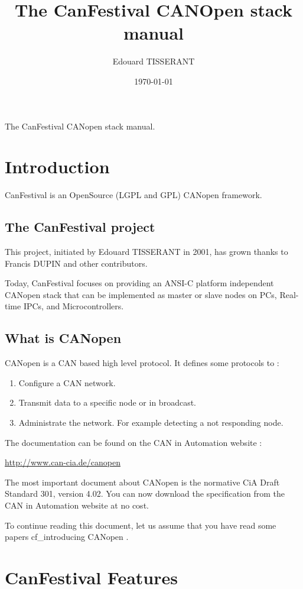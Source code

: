 \documentclass[12pt,english,a4paper]{book}
\title{\Huge The CanFestival CANOpen stack manual}
\author{Edouard TISSERANT}
\date{\today}
\newcommand{\canopen}{CANopen }
\begin{document}
{\centering\textsf{\huge The CanFestival \canopen stack manual.}}

\renewcommand{\contentsname}{CanFestival v3.0 Manual}
\setcounter{tocdepth}{2} \tableofcontents{}

\clearpage{}

\section{Introduction}

CanFestival is an OpenSource (LGPL and GPL) \canopen framework.

\subsection{The CanFestival project}

This project, initiated by Edouard TISSERANT in 2001, has grown thanks
to Francis DUPIN and other contributors.

Today, CanFestival focuses on providing an ANSI-C platform independent
\canopen stack that can be implemented as master or slave nodes on
PCs, Real-time IPCs, and Microcontrollers.


\subsection{What is \canopen}

CANopen is a CAN based high level protocol. It defines some protocols
to :

\begin{enumerate}
\item Configure a CAN network. 
\item Transmit data to a specific node or in broadcast. 
\item Administrate the network. For example detecting a not responding node. 
\end{enumerate}
The documentation can be found on the CAN in Automation website :

\href{http://www.can-cia.de/canopen}{http://www.can-cia.de/canopen}

The most important document about \canopen is the normative CiA Draft
Standard 301, version 4.02. You can now download the specification
from the CAN in Automation website at no cost.

To continue reading this document, let us assume that you have read
some papers cf_introducing \canopen .


\section{CanFestival Features}
\end{document}
